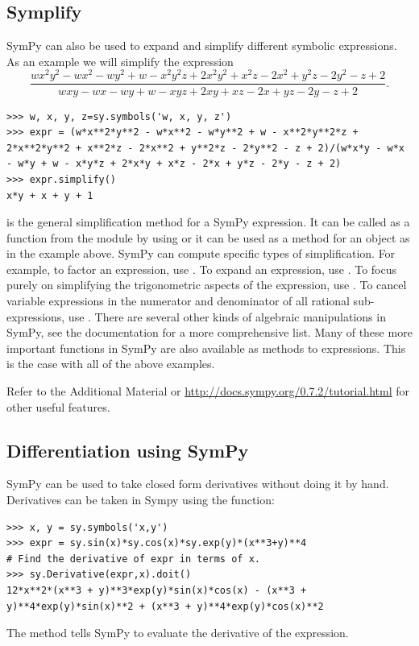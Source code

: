 \subsection*{Symplify} %

SymPy can also be used to expand and simplify different symbolic expressions.
As an example we will simplify the expression
\begin{equation*}
\frac{w x^2 y^2 - w x^2 - w y^2 + w - x^2 y^2 z + 2 x^2 y^2 + x^2 z - 2 x^2 + y^2 z - 2 y^2 - z + 2}{w x y - w x - w y + w - x y z + 2 x y + x z - 2 x + y z - 2 y - z + 2}.
\end{equation*}
\begin{lstlisting}
>>> w, x, y, z=sy.symbols('w, x, y, z')
>>> expr = (w*x**2*y**2 - w*x**2 - w*y**2 + w - x**2*y**2*z + 2*x**2*y**2 + x**2*z - 2*x**2 + y**2*z - 2*y**2 - z + 2)/(w*x*y - w*x - w*y + w - x*y*z + 2*x*y + x*z - 2*x + y*z - 2*y - z + 2)
>>> expr.simplify()
x*y + x + y + 1
\end{lstlisting}
 is the general simplification method for a SymPy expression.
It can be called as a function from the module by using  or it can be used as a method for an object as in the example above.
SymPy can compute specific types of simplification. For example, to factor an expression, use .
To expand an expression, use .
To focus purely on simplifying the trigonometric aspects of the expression, use .
To cancel variable expressions in the numerator and denominator of all rational sub-expressions, use .
There are several other kinds of algebraic manipulations in SymPy, see the documentation for a more comprehensive list.
Many of these more important functions in SymPy are also available as methods to expressions.
This is the case with all of the above examples.

Refer to the Additional Material or \url{http://docs.sympy.org/0.7.2/tutorial.html} for other useful features.

\subsection*{Differentiation using SymPy} %
SymPy can be used to take closed form derivatives without doing it by hand.
Derivatives can be taken in Sympy using the  function:
\begin{lstlisting}
>>> x, y = sy.symbols('x,y')
>>> expr = sy.sin(x)*sy.cos(x)*sy.exp(y)*(x**3+y)**4
# Find the derivative of expr in terms of x.
>>> sy.Derivative(expr,x).doit()
12*x**2*(x**3 + y)**3*exp(y)*sin(x)*cos(x) - (x**3 + y)**4*exp(y)*sin(x)**2 + (x**3 + y)**4*exp(y)*cos(x)**2
\end{lstlisting}
The  method tells SymPy to evaluate the derivative of the expression.

